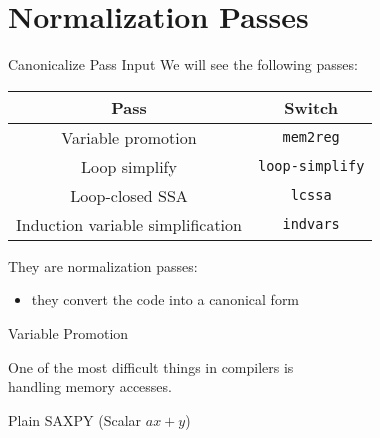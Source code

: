 
\section{Normalization Passes}


\begin{frame}{Canonicalize Pass Input}
We will see the following passes:

\begin{table}
\centering
\begin{tabular}{cc}
\toprule

\multicolumn{1}{c}{\textbf{Pass}}    &
\multicolumn{1}{c}{\textbf{Switch}} \\

\midrule

Variable promotion  &
\texttt{mem2reg}   \\

Loop simplify           &
\texttt{loop-simplify} \\

Loop-closed SSA  &
\texttt{lcssa}  \\

Induction variable simplification  &
\texttt{indvars}                  \\

\bottomrule
\end{tabular}
\end{table}

They are \alert{normalization} passes:

\begin{itemize}
\item they convert the code into a canonical form
\end{itemize}
\end{frame}


\begin{frame}{Variable Promotion}
\begin{center}
One of the most difficult things in compilers is\\\alert{handling memory accesses}.
\end{center}
\vfill
\begin{block}{Plain SAXPY (Scalar $ax + y$)}
\centering
{}
\end{block}
\end{frame}


